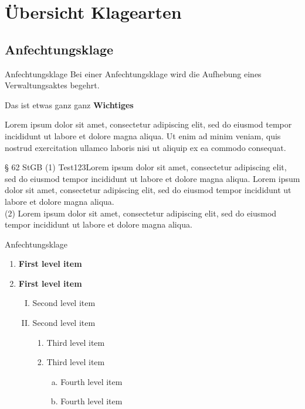 \documentclass{article}
\begin{document}
\section{Übersicht Klagearten}
\subsection{Anfechtungsklage}
\begin{definition}{Anfechtungsklage}
Bei einer Anfechtungsklage wird die Aufhebung eines Verwaltungsaktes begehrt.
\end{definition}

\begin{important-box}
Das ist etwas ganz ganz \textbf{Wichtiges}

Lorem ipsum dolor sit amet, consectetur adipiscing elit, sed do eiusmod tempor incididunt ut labore et dolore magna aliqua. Ut enim ad minim veniam, quis nostrud exercitation ullamco laboris nisi ut aliquip ex ea commodo consequat.
\end{important-box}

\begin{legal-text}{§ 62 StGB}
(1) Test123Lorem ipsum dolor sit amet, consectetur adipiscing elit, sed do eiusmod tempor incididunt ut labore et dolore magna aliqua. Lorem ipsum dolor sit amet, consectetur adipiscing elit, sed do eiusmod tempor incididunt ut labore et dolore magna aliqua.\\

(2) Lorem ipsum dolor sit amet, consectetur adipiscing elit, sed do eiusmod tempor incididunt ut labore et dolore magna aliqua. 
\end{legal-text}

\begin{schemata}{Anfechtungsklage}
\begin{enumerate}[\textbf{A.}]
   \item \textbf{First level item}
   \item \textbf{First level item}
   \begin{enumerate}[I.]
     \item Second level item
     \item Second level item
     \begin{enumerate}[1.]
       \item Third level item
       \item Third level item
       \begin{enumerate}[a)]
         \item Fourth level item
         \item Fourth level item
       \end{enumerate}
     \end{enumerate}
   \end{enumerate}
 \end{enumerate}
\end{schemata}
\end{document}
